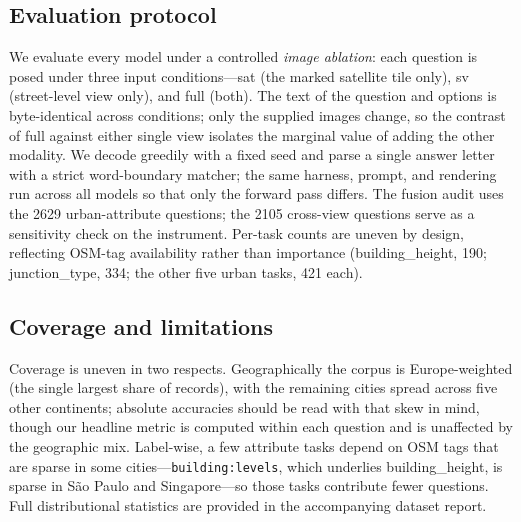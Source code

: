 \subsection{Evaluation protocol}
\label{sec:protocol}
We evaluate every model under a controlled \emph{image ablation}: each question is
posed under three input conditions---\textsf{sat} (the marked satellite tile only),
\textsf{sv} (street-level view only), and \textsf{full} (both). The text of the
question and options is byte-identical across conditions; only the supplied images
change, so the contrast of \textsf{full} against either single view isolates the
marginal value of adding the other modality. We decode greedily with a fixed seed and
parse a single answer letter with a strict word-boundary matcher; the same harness,
prompt, and rendering run across all models so that only the forward pass differs. The
fusion audit uses the \num{2629} urban-attribute questions; the \num{2105} cross-view
questions serve as a sensitivity check on the instrument. Per-task counts are uneven
by design, reflecting OSM-tag availability rather than importance
(\textsf{building\_height}, \num{190}; \textsf{junction\_type}, \num{334}; the other
five urban tasks, \num{421} each).

\subsection{Coverage and limitations}
\label{sec:coverage}
Coverage is uneven in two respects. Geographically the corpus is Europe-weighted
(the single largest share of records), with the remaining cities spread across five
other continents; absolute accuracies should be read with that skew in mind, though
our headline metric is computed within each question and is unaffected by the
geographic mix. Label-wise, a few attribute tasks depend on OSM tags that are
sparse in some cities---\texttt{building:levels}, which underlies
\textsf{building\_height}, is sparse in São Paulo and Singapore---so those tasks
contribute fewer questions. Full distributional statistics are provided in the
accompanying dataset report.
